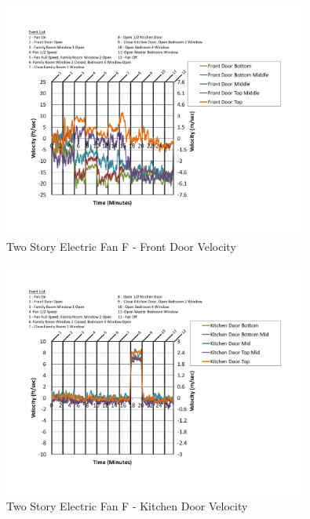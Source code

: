 \documentclass{article}
\begin{document}
\begin{appendices}
	\begin{figure}[H]
		\centering
		\includegraphics[height=3.05in,trim=0.67in 1.1in 0.67in 0.8in,clip=true]{0_Images/Results_Charts/ColdFlow/Two_Story/Electric/F/Front_Door_Velocity.pdf}
		\caption{Two Story Electric Fan F - Front Door Velocity}
	\end{figure}
 

	\begin{figure}[H]
		\centering
		\includegraphics[height=3.05in,trim=0.67in 1.1in 0.67in 0.8in,clip=true]{0_Images/Results_Charts/ColdFlow/Two_Story/Electric/F/Kitchen_Door_Velocity.pdf}
		\caption{Two Story Electric Fan F - Kitchen Door Velocity}
	\end{figure}
 
	\clearpage


\end{appendices}
\end{document}
